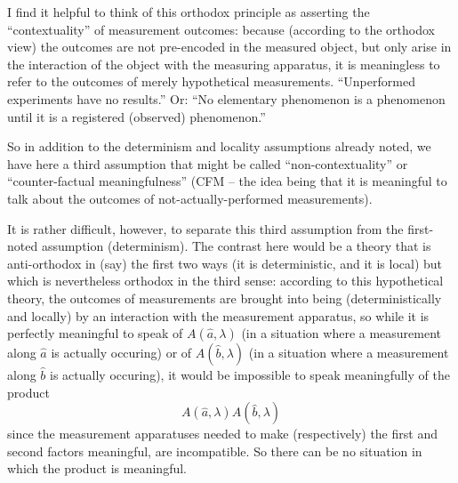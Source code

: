 \documentclass[aps,prc,twocolumn]{revtex4}
\begin{document}
I find it helpful to think of this orthodox principle as asserting the
``contextuality'' of measurement outcomes:  because (according to the
orthodox view) the outcomes are not pre-encoded in the measured object, but
only arise in the interaction of the  object with the measuring
apparatus, it is meaningless to refer to the outcomes of merely
hypothetical measurements.  ``Unperformed experiments have no
results.''\cite{peres}  Or:  ``No elementary phenomenon is a
phenomenon until it is a registered (observed) phenomenon.''\cite{wheeler}  

So in addition to the determinism and locality assumptions already
noted, we have here a third assumption that might be called
``non-contextuality'' or ``counter-factual meaningfulness'' (CFM -- 
the idea being that it is meaningful to talk about the outcomes of
not-actually-performed measurements).

It is rather difficult, however, to separate this third assumption
from the first-noted assumption (determinism).  The contrast here
would be a theory that is anti-orthodox in (say) the first two ways
(it is deterministic, and it is local) but which is nevertheless
orthodox in the third sense:  according to this 
hypothetical theory, the outcomes
of measurements are brought into being (deterministically and locally)
by an interaction with the measurement apparatus, so while it is
perfectly meaningful to speak of $A(\hat{a},\lambda)$ (in a situation
where a measurement along $\hat{a}$ is actually occuring) or of
$A(\hat{b},\lambda)$ (in a situation where a measurement along
  $\hat{b}$ is actually occuring), it would be impossible to speak
  meaningfully of the product
\begin{equation}
A(\hat{a},\lambda) A(\hat{b},\lambda)
\end{equation}
since the measurement apparatuses needed to make (respectively) the
first and second factors meaningful, are incompatible.  So there can
be no situation in which the product is meaningful.
\end{document}
